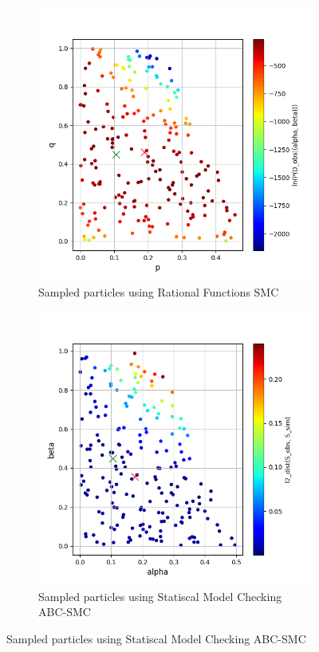 \begin{figure}[H]
    \centering
    \begin{subfigure}{0.48\textwidth}
        \centering
        \includegraphics[width=\linewidth]{figures/zeroconf4_rf.png}
        \caption{Sampled particles using Rational Functions SMC}
    \end{subfigure}
    \hfill
    \begin{subfigure}{0.48\textwidth}
        \centering
        \includegraphics[width=\linewidth]{figures/zeroconf4_sim.png}
        \caption{Sampled particles using Statiscal Model Checking ABC-SMC}
    \end{subfigure}
\end{figure}

